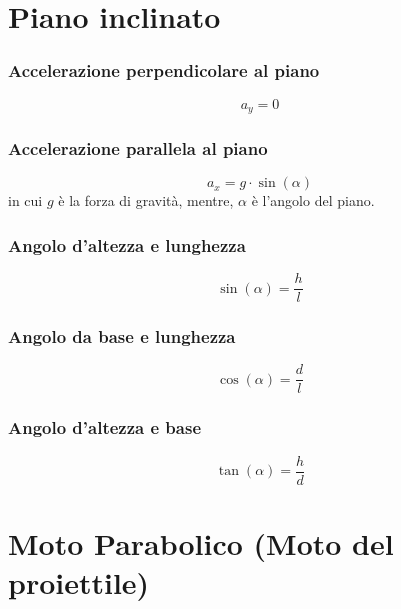 \documentclass{book}
\begin{document}
\section{Piano inclinato}
\label{sec:pianoinclinato}

\begin{multicols}{2}
  \subsubsection{Accelerazione perpendicolare al piano}
  \label{sec:accperpalpiano}
  \begin{equation*}
    a_y=0
  \end{equation*}
  
  \subsubsection{Accelerazione parallela al piano}
  \label{sec:accparalpiano}
  \begin{equation*}
    a_x=g\cdot \sin(\alpha)
  \end{equation*}
  in cui $g$ è la forza di gravità, mentre, $\alpha$ è l'angolo del piano.
  
  \subsubsection{Angolo d'altezza e lunghezza}
  \label{sec:angolodaltelung}
  \begin{equation*}
    \sin(\alpha)=\frac{h}{l}
  \end{equation*}
  
  \subsubsection{Angolo da base e lunghezza}
  \label{sec:angdabaseelungh}
  \begin{equation*}
    \cos(\alpha)=\frac{d}{l}
  \end{equation*}
  
  \subsubsection{Angolo d'altezza e base}
  \label{sec:angdaltebase}
  \begin{equation*}
    \tan(\alpha)=\frac{h}{d}
  \end{equation*}
\end{multicols}

\clearpage
\section{Moto Parabolico (Moto del proiettile)}
\label{sec:motoparabolico}
\end{document}
